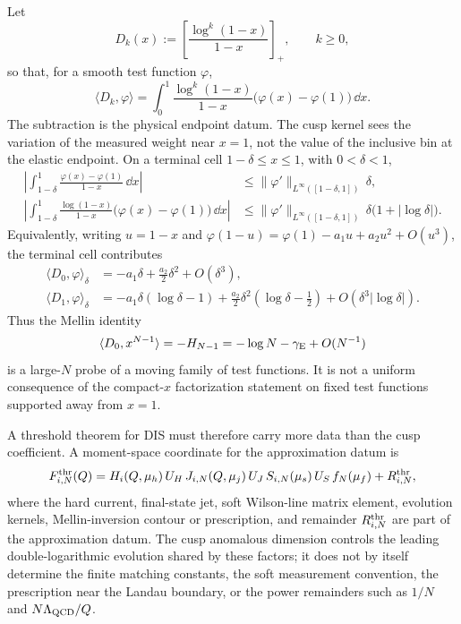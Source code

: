 \begin{controlledapproximation}
\label{ca:qcd-dis-threshold-plus-distribution-window}
Let
\[
  D_k(x):=\left[\frac{\log^k(1-x)}{1-x}\right]_+,\qquad k\ge0,
\]
so that, for a smooth test function \(\varphi\),
\begin{equation}
  \langle D_k,\varphi\rangle
  =
  \int_0^1
  \frac{\log^k(1-x)}{1-x}
  \bigl(\varphi(x)-\varphi(1)\bigr)\,\dd x .
  \label{eq:qcd-dis-threshold-plus-action}
\end{equation}
The subtraction is the physical endpoint datum.  The cusp kernel sees the
variation of the measured weight near \(x=1\), not the value of the inclusive
bin at the elastic endpoint.  On a terminal cell \(1-\delta\le x\le1\), with
\(0<\delta<1\),
\begin{align}
  \left|\int_{1-\delta}^1
  \frac{\varphi(x)-\varphi(1)}{1-x}\,\dd x\right|
  &\le
  \|\varphi'\|_{L^\infty([1-\delta,1])}\,\delta,
  \label{eq:qcd-dis-d0-terminal-bound}\\
  \left|\int_{1-\delta}^1
  \frac{\log(1-x)}{1-x}
  \bigl(\varphi(x)-\varphi(1)\bigr)\,\dd x\right|
  &\le
  \|\varphi'\|_{L^\infty([1-\delta,1])}\,
  \delta\bigl(1+|\log\delta|\bigr).
  \label{eq:qcd-dis-d1-terminal-bound}
\end{align}
Equivalently, writing \(u=1-x\) and
\(\varphi(1-u)=\varphi(1)-a_1u+a_2u^2+O(u^3)\), the terminal cell contributes
\begin{align}
  \langle D_0,\varphi\rangle_{\delta}
  &=
  -a_1\delta+\frac{a_2}{2}\delta^2+O(\delta^3),
  \label{eq:qcd-dis-d0-terminal-taylor}\\
  \langle D_1,\varphi\rangle_{\delta}
  &=
  -a_1\delta(\log\delta-1)
  +\frac{a_2}{2}\delta^2\left(\log\delta-\frac12\right)
  +O(\delta^3|\log\delta|).
  \label{eq:qcd-dis-d1-terminal-taylor}
\end{align}
Thus the Mellin identity
\[
  \langle D_0,x^{N-1}\rangle=-H_{N-1}
  =
  -\log N-\gamma_{\rm E}+O(N^{-1})
\]
is a large-\(N\) probe of a moving family of test functions.  It is not a
uniform consequence of the compact-\(x\) factorization statement on fixed test
functions supported away from \(x=1\).

A threshold theorem for DIS must therefore carry more data than the cusp
coefficient.  A moment-space coordinate for the approximation datum is
\begin{equation}
  F_{i,N}^{\rm thr}(Q)
  =
  H_i(Q,\mu_h)\,
  U_H\,
  J_{i,N}(Q,\mu_j)\,
  U_J\,
  S_{i,N}(\mu_s)\,
  U_S\,
  f_N(\mu_f)
  +R_{i,N}^{\rm thr},
  \label{eq:qcd-dis-threshold-factorized-coordinate}
\end{equation}
where the hard current, final-state jet, soft Wilson-line matrix element,
evolution kernels, Mellin-inversion contour or prescription, and remainder
\(R_{i,N}^{\rm thr}\) are part of the approximation datum.  The cusp anomalous
dimension controls the leading double-logarithmic evolution shared by these
factors; it does not by itself determine the finite matching constants, the
soft measurement convention, the prescription near the Landau boundary, or the
power remainders such as \(1/N\) and \(N\Lambda_{\rm QCD}/Q\).
\end{controlledapproximation}

